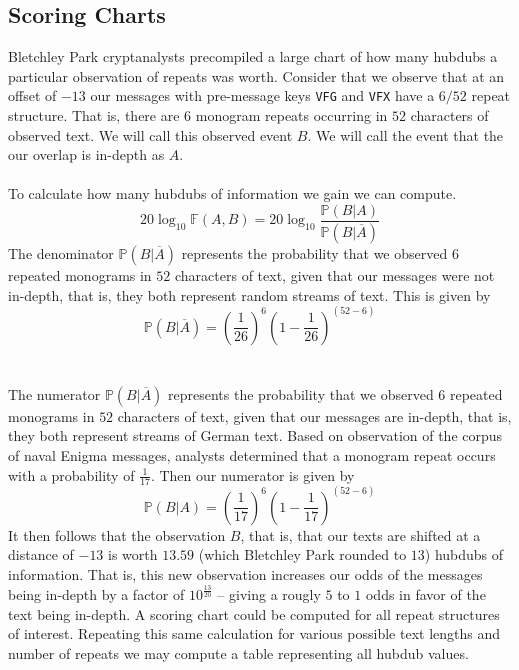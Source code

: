 \subsection{Scoring Charts}
Bletchley Park cryptanalysts precompiled a large chart of how many
hubdubs a particular observation of repeats was worth. Consider
that we observe that at an offset of $-13$ our messages with
pre-message keys \texttt{VFG} and \texttt{VFX} have a $6/52$ repeat
structure. That is, there are $6$ monogram repeats occurring in $52$
characters of observed text. We will call this observed event $B$.
We will call the event that the our overlap is in-depth as $A$.
\\\\To calculate how many hubdubs of information we gain we can compute.
\[
	20\log_{10}\mathbb{F}(A,B) =
	20\log_{10}\frac{\mathbb{P}(B|A)}{\mathbb{P}(B|\overline{A})}
\]
The denominator $\mathbb{P}(B|\overline{A})$ represents the
probability that we observed $6$ repeated monograms in $52$
characters of text, given that our messages were not in-depth, that
is, they both represent random streams of text. This is given by
\[
	\mathbb{P}(B|\overline{A}) = (\frac{1}{26})^6(1-\frac{1}{26})^{(52-6)}
\]
\\\\The numerator $\mathbb{P}(B|\overline{A})$ represents the
probability that we observed $6$ repeated monograms in $52$
characters of text, given that our messages are in-depth, that is,
they both represent streams of German text. Based on observation of
the corpus of naval Enigma messages, analysts determined that a
monogram repeat occurs with a probability of $\frac{1}{17}$. Then
our numerator is given by
\[
	\mathbb{P}(B|A) = (\frac{1}{17})^6(1-\frac{1}{17})^{(52-6)}
\]
It then follows that the observation $B$, that is, that our texts
are shifted at a distance of $-13$ is worth $13.59$ (which
Bletchley Park rounded to $13$) hubdubs of information. That is,
this new observation increases our odds of the messages being
in-depth by a factor of $10^\frac{13}{20}$ -- giving a rougly $5$
to $1$ odds in favor of the text being in-depth. A scoring chart
could be computed for all repeat structures of interest. Repeating
this same calculation for various possible text lengths and number
of repeats we may compute a table representing all hubdub values.
